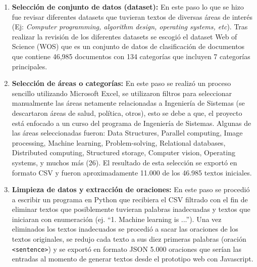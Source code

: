 \documentclass[../Main.tex]{subfiles}
\begin{document}
            \begin{enumerate}
                \item \textbf{Selección de conjunto de datos (dataset):} En este paso lo que se hizo fue revisar diferentes datasets que tuvieran textos de diversas áreas de interés (Ej: \textit{Computer programming, algorithm design, operating systems, etc}). Tras realizar la revisión de los diferentes datasets se escogió el dataset Web of Science (WOS) \cite{52} que es un conjunto de datos de clasificación de documentos que contiene 46,985 documentos con 134 categorías que incluyen 7 categorías principales.
                
                \item \textbf{Selección de áreas o categorías:} En este paso se realizó un proceso sencillo utilizando Microsoft Excel, se utilizaron filtros para seleccionar manualmente las áreas netamente relacionadas a Ingeniería de Sistemas (se descartaron áreas de salud, política, otros), esto se debe a que, el proyecto está enfocado a un curso del programa de Ingeniería de Sistemas.
                Algunas de las áreas seleccionadas fueron: Data Structures, Parallel computing, Image processing, Machine learning, Problem-solving, Relational databases, Distributed computing, Structured storage, Computer vision, Operating systems, y muchos más (26). El resultado de esta selección se exportó en formato CSV y fueron aproximadamente 11.000 de los 46.985 textos iniciales.
                
                \item \textbf{Limpieza de datos y extracción de oraciones:} En este paso se procedió a escribir un programa en Python que recibiera el CSV filtrado con el fin de eliminar textos que posiblemente tuvieran palabras inadecuadas y textos que iniciaran con enumeración (ej. ``1. Machine learning is ...'').
                Una vez eliminados los textos inadecuados se procedió a sacar las oraciones de los textos originales, se redujo cada texto a sus diez primeras palabras (oración \texttt{<sentence>}) y se exportó en formato JSON 5.000 oraciones que serían las entradas al momento de generar textos desde el prototipo web con Javascript.
            \end{enumerate}
            
\end{document}
